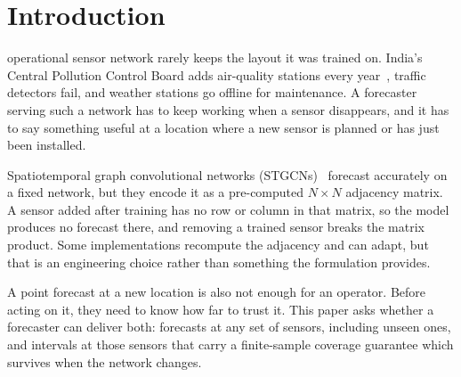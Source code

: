 \documentclass[journal]{IEEEtran}
\begin{document}
\section{Introduction}
\label{sec:introduction}

 operational sensor network rarely keeps the layout it was trained on. India's
Central Pollution Control Board adds air-quality stations every year~\cite{panja2026estgcn}, traffic
detectors fail, and weather stations go offline for maintenance. A forecaster serving such a network
has to keep working when a sensor disappears, and it has to say something useful at a location where
a new sensor is planned or has just been installed.

Spatiotemporal graph convolutional networks (STGCNs)~\cite{yu2018stgcn} forecast accurately on a
fixed network, but they encode it as a pre-computed $N\times N$ adjacency matrix. A sensor added after
training has no row or column in that matrix, so the model produces no forecast there, and removing a
trained sensor breaks the matrix product. Some implementations recompute the adjacency and can adapt,
but that is an engineering choice rather than something the formulation provides.

A point forecast at a new location is also not enough for an operator. Before acting on it, they need
to know how far to trust it. This paper asks whether a forecaster can deliver both: forecasts at any
set of sensors, including unseen ones, and intervals at those sensors that carry a finite-sample
coverage guarantee which survives when the network changes.
\end{document}
